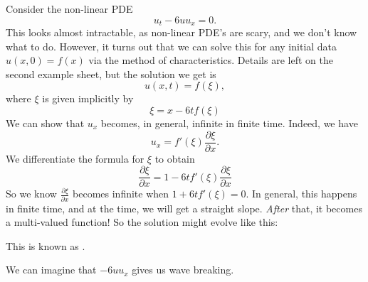 \documentclass[a4paper]{article}
\begin{document}
\begin{eg}
  Consider the non-linear PDE
  \[
    u_t - 6 uu_x = 0.
  \]
  This looks almost intractable, as non-linear PDE's are scary, and we don't know what to do. However, it turns out that we can solve this for any initial data $u(x, 0) = f(x)$ via the method of characteristics. Details are left on the second example sheet, but the solution we get is
  \[
    u(x, t) = f(\xi),
  \]
  where $\xi$ is given implicitly by
  \[
    \xi = x - 6t f(\xi)
  \]
  We can show that $u_x$ becomes, in general, infinite in finite time. Indeed, we have
  \[
    u_x = f'(\xi) \frac{\partial \xi}{\partial x}.
  \]
  We differentiate the formula for $\xi$ to obtain
  \[
    \frac{\partial \xi}{\partial x} = 1 - 6tf'(\xi) \frac{\partial \xi}{\partial x}
  \]
  So we know $\frac{\partial \xi}{\partial x}$ becomes infinite when $1 + 6t f'(\xi) = 0$. In general, this happens in finite time, and at the time, we will get a straight slope. \emph{After} that, it becomes a multi-valued function! So the solution might evolve like this:
  \begin{center}
  \end{center}
  This is known as .

  We can imagine that $-6uu_x$ gives us wave breaking.
\end{eg}
\end{document}
